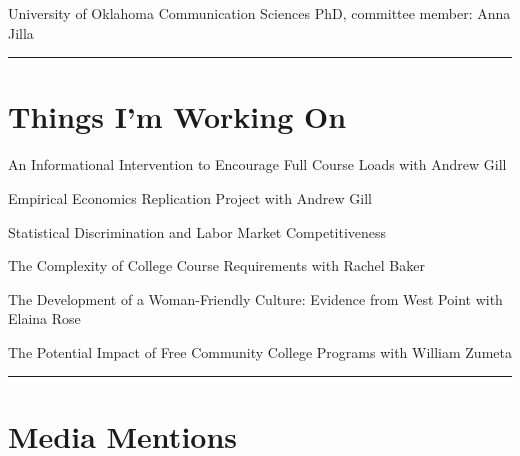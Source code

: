 \documentclass[11pt,a4paper]{article}
\begin{document}
University of Oklahoma Communication Sciences PhD, committee member: Anna Jilla



\vspace{1cm} \hrule \vspace{1cm}





\section*{Things I'm Working On} 



An Informational Intervention to Encourage Full Course Loads with Andrew Gill



Empirical Economics Replication Project with Andrew Gill



Statistical Discrimination and Labor Market Competitiveness



The Complexity of College Course Requirements with Rachel Baker



The Development of a Woman-Friendly Culture: Evidence from West Point with Elaina Rose



The Potential Impact of Free Community College Programs with William Zumeta



\vspace{1cm} \hrule \vspace{1cm}





\section*{Media Mentions} 
\end{document}

